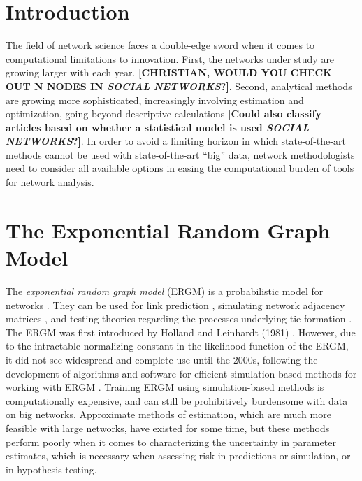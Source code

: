 \documentclass[10pt, conference, compsocconf]{IEEEtran}
\begin{document}
\section{Introduction}
\noindent The field of network science faces a double-edge sword when it comes to computational limitations to innovation. First, the networks under study are growing larger with each year. {\bf [CHRISTIAN, WOULD YOU CHECK OUT N NODES IN {\em SOCIAL NETWORKS}?]}. Second, analytical methods are growing more sophisticated, increasingly involving estimation and optimization, going beyond descriptive calculations {\bf [Could also classify articles based on whether a statistical model is used {\em SOCIAL NETWORKS}?]}. In order to avoid a limiting horizon in which state-of-the-art methods cannot be used with state-of-the-art ``big'' data, network methodologists need to consider all available options in easing the computational burden of tools for network analysis.

\section{The Exponential Random Graph Model}
\noindent The \textit{exponential random graph model} (ERGM) is a probabilistic model for networks \cite{chatterjee2013estimating,Wasserman.1996,robins.pattison.2007}. They can be used for link prediction \cite{lu2010supervised}, simulating network adjacency matrices \cite{hackney2006agent}, and testing theories regarding the processes underlying tie formation \cite{goodreau2009birds}. The ERGM was first introduced by Holland and Leinhardt (1981) \cite{holland1981exponential}. However, due to the intractable normalizing constant in the likelihood function of the ERGM, it did not see widespread and complete use until the 2000s, following the development of algorithms and software for efficient simulation-based methods for working with ERGM \cite{snijders2002markov}. Training ERGM using simulation-based methods is computationally expensive, and can still be prohibitively burdensome with data on big networks. Approximate methods of estimation, which are much more feasible with large networks, have existed for some time, but these methods perform poorly when it comes to characterizing the uncertainty in parameter estimates, which is necessary when assessing risk in predictions or simulation, or in hypothesis testing.
\end{document}
